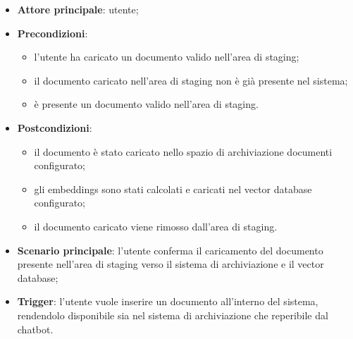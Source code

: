 \documentclass[10pt, a4paper]{article}
\begin{document}
    \begin{itemize}
        \item \textbf{Attore principale}: utente;
        \item \textbf{Precondizioni}:
            \begin{itemize}
                \item l’utente ha caricato un documento valido nell’area di staging;
                \item il documento caricato nell'area di staging non è già presente nel sistema;
                \item è presente un documento valido nell’area di staging.
            \end{itemize}
        \item \textbf{Postcondizioni}:
        \begin{itemize}
            \item il documento è stato caricato nello spazio di archiviazione documenti configurato;
            \item gli embeddings sono stati calcolati e caricati nel vector database configurato;
            \item il documento caricato viene rimosso dall’area di staging.
        \end{itemize}
        \item \textbf{Scenario principale}: l’utente conferma il caricamento del documento presente nell’area di staging verso il sistema di archiviazione e il vector database;
        \item \textbf{Trigger}: l’utente vuole inserire un documento all’interno del sistema, rendendolo disponibile sia nel sistema di archiviazione che reperibile dal chatbot.
    \end{itemize}

\end{document}

